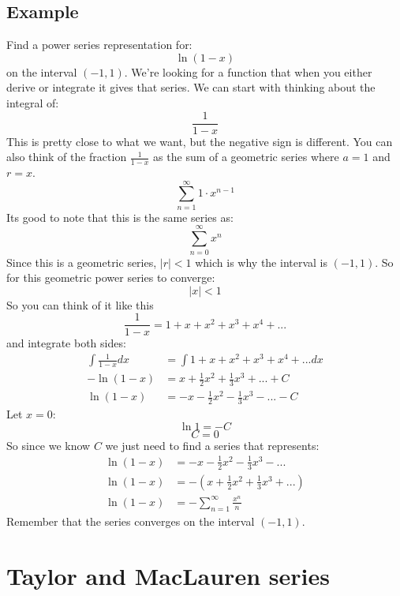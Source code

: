 \documentclass{article}
\begin{document}
    \subsection{Example}
        Find a power series representation for:
        \[\ln (1-x)\]
        on the interval \((-1, 1)\).
        We're looking for a function that when you either derive or integrate it gives that series.
        We can start with thinking about the integral of:
        \[\frac{1}{1-x}\]
        This is pretty close to what we want, but the negative sign is different.
        You can also think of the fraction \(\frac{1}{1-x}\) as the sum of a geometric series where \(a = 1\) and \(r = x\).
        \[\sum_{n = 1}^{\infty} 1 \cdot x^{n-1} \]
        Its good to note that this is the same series as:
        \[\sum_{n=0}^{\infty} x^n\]
        Since this is a geometric series, \(|r| < 1\) which is why the interval is \((-1, 1)\).
        So for this geometric power series to converge:
        \[|x| < 1\]
        So you can think of it like this
        \[\frac{1}{1-x} = 1 + x + x^2 + x^3 + x^4 + ...\]
        and integrate both sides:
        \begin{align*}
            \int \frac{1}{1-x} dx &= \int 1 + x + x^2 + x^3 + x^4 + ... dx \\
            - \ln (1-x) &= x + \frac{1}{2}x^2 + \frac{1}{3}x^3 + ... + C \\
            \ln (1-x) &= -x - \frac{1}{2}x^2 - \frac{1}{3}x^3 - ... - C 
        \end{align*}
        Let \(x = 0\):
        \[\ln 1 = -C\]
        \[C = 0\]
        So since we know \(C\) we just need to find a series that represents:
        \begin{align*}
            \ln (1-x) &= -x - \frac{1}{2}x^2 - \frac{1}{3}x^3 - ... \\
            \ln (1-x) &= -(x + \frac{1}{2}x^2 + \frac{1}{3}x^3 + ...) \\
            \ln (1-x) &= - \sum_{n = 1}^{\infty} \frac{x^n}{n}
        \end{align*}
        Remember that the series converges on the interval \((-1, 1)\).

\section{Taylor and MacLauren series}
    
\end{document}
